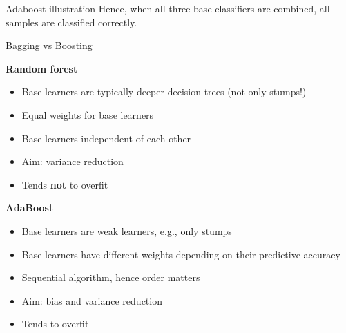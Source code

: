 \begin{vbframe}{Adaboost illustration}
Hence, when all three base classifiers are combined, all samples are classified 
correctly.

\end{vbframe}











\begin{vbframe}{Bagging vs Boosting}

\begin{minipage}[t]{0.47\textwidth}
  \textbf{Random forest}
  \begin{itemize}
    \item Base learners are typically deeper decision trees (not only stumps!)
    \item Equal weights for base learners
    \item Base learners independent of each other
    \item Aim: variance reduction
    \item Tends \textbf{not} to overfit
  \end{itemize}
\end{minipage}%
\begin{minipage}[t]{0.06\textwidth}
  \phantom{foo}
\end{minipage}%
\begin{minipage}[t]{0.47\textwidth}
  \textbf{AdaBoost}
  \begin{itemize}
    \item Base learners are weak learners, e.g., only stumps
    \item Base learners have different weights depending on their predictive 
    accuracy
    \item Sequential algorithm, hence order matters
    \item Aim: bias and variance reduction
    \item Tends to overfit
  \end{itemize}
\end{minipage}

\end{vbframe}

